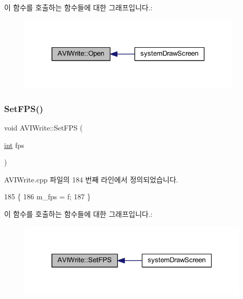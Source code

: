 이 함수를 호출하는 함수들에 대한 그래프입니다.\+:
\nopagebreak
\begin{figure}[H]
\begin{center}
\leavevmode
\includegraphics[width=302pt]{class_a_v_i_write_a2b4ef2aeeef846bcb12ef58189043eb1_icgraph}
\end{center}
\end{figure}
\mbox{\label{class_a_v_i_write_a3beb976b918287e0592ab4feebd9ce59}} 
\subsubsection{\texorpdfstring{Set\+F\+P\+S()}{SetFPS()}}
{\footnotesize\ttfamily void A\+V\+I\+Write\+::\+Set\+F\+PS (\begin{DoxyParamCaption}\item[{\mbox{\hyperlink{_util_8cpp_a0ef32aa8672df19503a49fab2d0c8071}{int}}}]{fps }\end{DoxyParamCaption})}



A\+V\+I\+Write.\+cpp 파일의 184 번째 라인에서 정의되었습니다.


\begin{DoxyCode}
185 \{
186   m\_fps = f;
187 \}
\end{DoxyCode}
이 함수를 호출하는 함수들에 대한 그래프입니다.\+:
\nopagebreak
\begin{figure}[H]
\begin{center}
\leavevmode
\includegraphics[width=313pt]{class_a_v_i_write_a3beb976b918287e0592ab4feebd9ce59_icgraph}
\end{center}
\end{figure}
\mbox{\label{class_a_v_i_write_a8d864e6e2cea4147ffa6f24d69fbe339}} 
